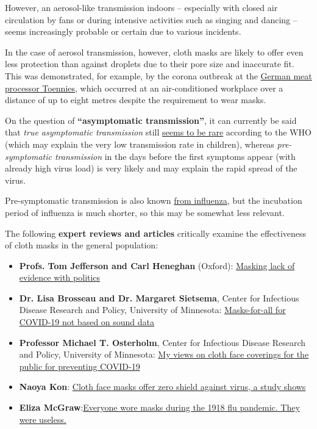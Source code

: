 However, an aerosol-like transmission indoors -- especially with closed
air circulation by fans or during intensive activities such as singing
and dancing -- seems increasingly probable or certain due to various
incidents.

In the case of aerosol transmission, however, cloth masks are likely to
offer even less protection than against droplets due to their pore size
and inaccurate fit. This was demonstrated, for example, by the corona
outbreak at the
\href{https://swprs.org/tonnies-corona-ausbruch-trotz-maskenpflicht/}{German
meat processor Toennies}, which occurred at an air-conditioned workplace
over a distance of up to eight metres despite the requirement to wear
masks.

On the question of \textbf{``asymptomatic transmission''}, it can
currently be said that \emph{true asymptomatic transmission} still
\href{https://www.webmd.com/lung/news/20200609/who-clairifies-comments-on-asymptomatic-covid-spread}{seems
to be rare} according to the WHO (which may explain the very low
transmission rate in children), whereas \emph{pre-symptomatic
transmission} in the days before the first symptoms appear (with already
high virus load) is very likely and may explain the rapid spread of the
virus.

Pre-symptomatic transmission is also known
\href{https://virologydownunder.com/influenza-virus-transmission-with-or-without-symptoms-youre-dropping-flu-virus/}{from
influenza}, but the incubation period of influenza is much shorter, so
this may be somewhat less relevant.

The following \textbf{expert reviews and articles} critically examine
the effectiveness of cloth masks in the general population:

\begin{itemize}
\tightlist
\item
  \textbf{Profs. Tom Jefferson and Carl Heneghan} (Oxford):
  \href{https://www.cebm.net/covid-19/masking-lack-of-evidence-with-politics/}{Masking
  lack of evidence with politics}
\item
  \textbf{Dr. Lisa Brosseau and Dr. Margaret Sietsema}, Center for
  Infectious Disease Research and Policy, University of Minnesota:
  \href{https://www.cidrap.umn.edu/news-perspective/2020/04/commentary-masks-all-covid-19-not-based-sound-data}{Masks-for-all
  for COVID-19 not based on sound data}
\item
  \textbf{Professor Michael T. Osterholm}, Center for Infectious Disease
  Research and Policy, University of Minnesota:
  \href{https://www.cidrap.umn.edu/news-perspective/2020/07/commentary-my-views-cloth-face-coverings-public-preventing-covid-19}{My
  views on cloth face coverings for the public for preventing COVID-19}
\item
  \textbf{Naoya Kon}:
  \href{http://www.asahi.com/ajw/articles/13523664}{Cloth face masks
  offer zero shield against virus, a study shows}
\item
  \textbf{Eliza
  McGraw}:\href{https://www.seattletimes.com/nation-world/everyone-wore-masks-during-the-1918-flu-pandemic-they-were-useless/}{Everyone
  wore masks during the 1918 flu pandemic. They were useless.}
\end{itemize}

